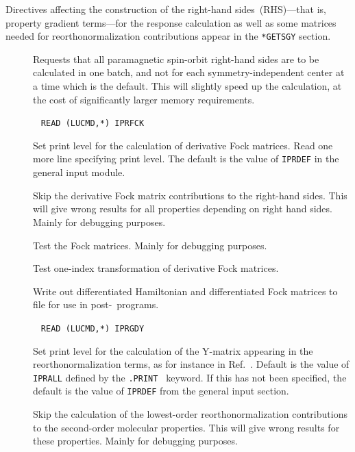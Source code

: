 Directives affecting the construction of the right-hand
sides~(RHS)---that is,
property gradient terms---for the response 
calculation as well as some matrices needed for reorthonormalization
contributions appear in the \verb|*GETSGY| section. 

\begin{description}
\item[] Requests that all paramagnetic
spin-orbit
right-hand sides are to be calculated in one batch, and not for each
symmetry-independent center at a time which is the default. This will
slightly speed up the calculation, at the cost of significantly larger
memory requirements.

\item[]\verb| |\newline
\verb|READ (LUCMD,*) IPRFCK|

Set print level for the calculation of derivative Fock matrices.  Read
one more line specifying print level. The default  is the value of
\verb|IPRDEF| in the general input module.

\item[] Skip the derivative Fock matrix contributions
to the right-hand sides. This will give wrong results for all
properties depending on right hand sides. Mainly for debugging purposes.

\item[] Test the Fock matrices. Mainly for debugging
purposes.

\item[] Test one-index transformation of derivative
Fock matrices. 

\item[] Write out differentiated Hamiltonian and
differentiated Fock matrices to file for use in post-\siraba\ programs.

\item[]\verb| |\newline
\verb|READ (LUCMD,*) IPRGDY|

Set print level for the calculation of the Y-matrix appearing in the
reorthonormalization terms, as for instance in
Ref.~\cite{tuhjahjajpjjcp84}. Default  is the value of \verb|IPRALL|
defined by the \verb|.PRINT | keyword. If 
this has not been specified, the default is the value of \verb|IPRDEF|
from the general input section.

\item[] Skip the calculation of the lowest-order
reorthonormalization contributions to the second-order molecular
properties. This will give wrong results for these properties. Mainly
for debugging purposes.


\end{description}
